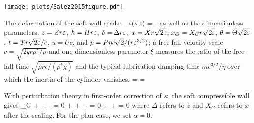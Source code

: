 \documentclass[books,12pt]{elegantpaper}
\begin{document}
\begin{center}
\texttt{[image: plots/Salez2015figure.pdf]}
\end{center}

The deformation of the soft wall reads:
\beq \delta_s(x,t) = -   \eeq
as well as the dimensionless parameters:
$z=Zr\varepsilon$, $h=Hr\varepsilon$, $\delta = \Delta r\varepsilon$, $x = Xr\sqrt{2\varepsilon}$, $x_G=X_G r \sqrt{2\varepsilon}$, $\theta = \Theta\sqrt{2\varepsilon}$, $t=Tr\sqrt{2\varepsilon}/c$, $u=Uc$, and $p=P\eta c\sqrt{2}/(r\varepsilon^{3/2})$; a free fall velocity scale $c=\sqrt{2gr\rho^\ast / \rho}$ and one dimensionless parameter $\xi$ measures the ratio of the free fall time $\sqrt{\rho r \epsilon / (\rho^\ast g)}$ and the typical lubrication damping time $m\epsilon^{3/2}/\eta$ over which the inertia of the cylinder vanishes.
\beq \xi =  
\beq \kappa =  

With perturbation theory in first-order correction of $\kappa$, the soft compressible wall gives 
\beq {}_G +   +   -  \sin\alpha = 0  \eeq
\beq \ddot{\Delta} + \xi {} +   + \cos\alpha = 0   \eeq
\beq \ddot{\Theta} +  \frac{\dot\Theta}{\sqrt\Delta} +   = 0  \eeq
where $\Delta$ refers to $z$ and $X_G$ refers to $x$ after the scaling. For the plan case, we set $\alpha=0$. %
\end{document}
